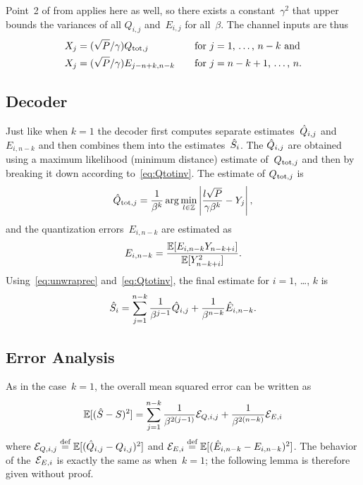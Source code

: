 Point~2 of  from  applies here as
well, so there exists a constant~$\gamma^2$ that upper bounds the variances of
all $Q_{i,j}$ and~$E_{i,j}$ for all~$\beta$. The channel inputs are thus
\begin{align*}
  X_j &= (\sqrt{P}/\gamma) Q_{\operatorname{tot},j} &&\quad\text{for $j = 1$, \dots, $n-k$ and}
  \\
  X_j &= (\sqrt{P}/\gamma) E_{j-n+k,n-k} &&\quad\text{for $j = n-k+1$, \dots,
  $n$.}
\end{align*}


\subsection{Decoder}

Just like when $k=1$ the decoder first computes separate estimates~$\hat{Q}_{i,j}$
and~$E_{i,n-k}$ and then combines them into the estimates~${\hat{S}}_i$. The
$\hat{Q}_{i,j}$ are obtained using a maximum likelihood (minimum distance) estimate
of~$Q_{\operatorname{tot},j}$ and then by breaking it down according to~\eqref{eq:Qtotinv}.
The estimate of $Q_{\operatorname{tot},j}$ is
\begin{equation*}
  \hat{Q}_{\operatorname{tot},j} = \frac{1}{\beta^k} \arg\min_{l\in\mathbb{Z}}
  \left| \frac{l\sqrt P}{\gamma \beta^k} - Y_j \right|,
\end{equation*}
and the quantization errors~$E_{i,n-k}$ are estimated as
\begin{equation*}
  E_{i,n-k} = \frac{\mathbb{E}[E_{i,n-k} Y_{n-k+i}]}{\mathbb{E}[Y_{n-k+i}^2]}.
\end{equation*}
Using~\eqref{eq:unwraprec} and~\eqref{eq:Qtotinv}, the final estimate for $i =
1$, \dots, $k$ is
\begin{equation*}
  {\hat{S}}_i = \sum_{j=1}^{n-k} \frac{1}{\beta^{j-1}} \hat{Q}_{i,j} +
  \frac{1}{\beta^{n-k}} \hat{E}_{i,n-k}.
\end{equation*}


\subsection{Error Analysis}

As in the case~$k=1$, the overall mean squared error can be written as
\begin{equation*}
  {\mathbb{E}[({\hat{S}}- S)^2]} = \sum_{j=1}^{n-k} \frac{1}{\beta^{2(j-1)}} {\mathcal{E}}_{Q,i,j} + 
  \frac{1}{\beta^{2(n-k)}} {\mathcal{E}}_{E,i}
\end{equation*}
where ${\mathcal{E}}_{Q,i,j} \stackrel{\text{def}}{=} \mathbb{E}[(\hat{Q}_{i,j} - Q_{i,j})^2]$ and ${\mathcal{E}}_{E,i} \stackrel{\text{def}}{=}
\mathbb{E}[(\hat{E}_{i,n-k} - E_{i,n-k})^2]$. The behavior of the~${\mathcal{E}}_{E,i}$ is exactly
the same as when~$k=1$; the following lemma is therefore given without proof.


